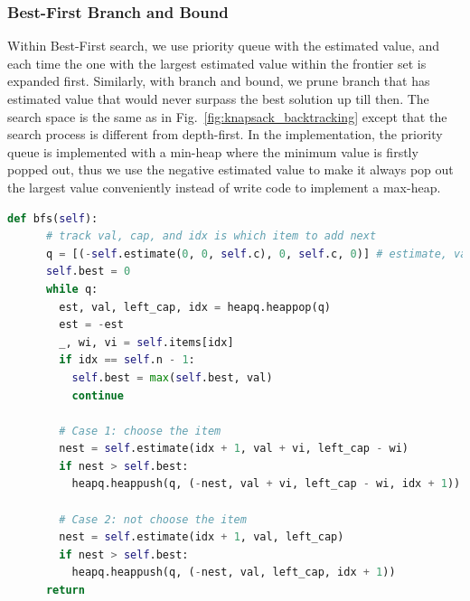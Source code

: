 \documentclass[../main.tex]{subfiles}
\begin{document}
\subsubsection{Best-First Branch and Bound}
Within Best-First search, we use priority queue with the estimated value, and each time the one with the largest estimated value within the frontier set is expanded first. Similarly, with branch and bound, we prune branch that has estimated value that would never surpass the best solution up till then. The search space is the same as in   Fig.~\ref{fig:knapsack_backtracking} except that the search process is different from depth-first. In the implementation, the priority queue is implemented with a min-heap where the minimum value is firstly popped out, thus we use the negative estimated value to make it always pop out the largest value conveniently instead of write code to implement a max-heap. 
\begin{lstlisting}[language=Python]
  def bfs(self):
      # track val, cap, and idx is which item to add next
      q = [(-self.estimate(0, 0, self.c), 0, self.c, 0)] # estimate, val, left_cap, idx
      self.best = 0
      while q:
        est, val, left_cap, idx = heapq.heappop(q)
        est = -est
        _, wi, vi = self.items[idx]
        if idx == self.n - 1:
          self.best = max(self.best, val)
          continue
        
        # Case 1: choose the item
        nest = self.estimate(idx + 1, val + vi, left_cap - wi)
        if nest > self.best:
          heapq.heappush(q, (-nest, val + vi, left_cap - wi, idx + 1))

        # Case 2: not choose the item
        nest = self.estimate(idx + 1, val, left_cap)
        if nest > self.best:
          heapq.heappush(q, (-nest, val, left_cap, idx + 1))
      return 
\end{lstlisting}
\end{document}
